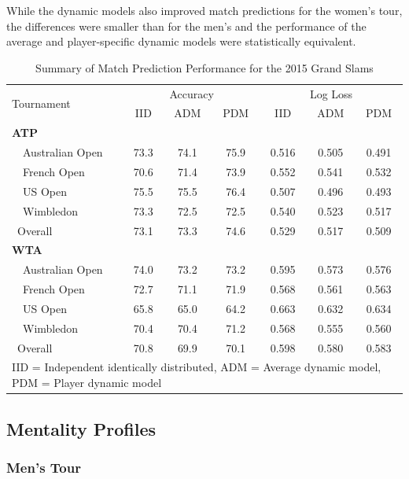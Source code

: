 \documentclass{Latex/svjour3}
\begin{document}
While the dynamic models also improved match predictions for the
women's tour, the differences were smaller than for the men's and the
performance of the average and player-specific dynamic models were
statistically equivalent. 

\begin{table} \centering
\caption{Summary of Match Prediction Performance for the 2015 Grand Slams}
\begin{tabular}{l ccc ccc} \hline
\multirow{2}{*}{Tournament} & \multicolumn{3}{c}{Accuracy} & \multicolumn{3}{c}{Log Loss} \\ 
&	IID &ADM &PDM &IID &ADM &PDM \\ \hline
\textbf{ATP} & & & & & & \\
~~Australian Open	&73.3&	74.1&	75.9&	0.516&	0.505	&0.491\\
~~French Open	&70.6&	71.4&	73.9&	0.552&	0.541	&0.532\\
~~US Open	&75.5&	75.5&	76.4&	0.507&	0.496&	0.493\\
~~Wimbledon	&73.3&	72.5&	72.5&	0.540&	0.523&	0.517\\
~Overall	&73.1&	73.3&	74.6&	0.529&	0.517&	0.509                    \\
\textbf{WTA}  & & & & & & \\
~~Australian Open	&74.0&	73.2&	73.2&	0.595&	0.573&	0.576\\
~~French Open	&72.7&	71.1&	71.9&	0.568&	0.561&	0.563\\
~~US Open	&65.8&	65.0&	64.2&	0.663&	0.632&	0.634\\
~~Wimbledon	&70.4&	70.4&	71.2&	0.568&	0.555&	0.560\\
~Overall	&70.8&	69.9&	70.1&	0.598	&0.580& 0.583\\ \hline
\multicolumn{7}{p{3.8in}}{IID = Independent identically distributed, ADM =
  Average dynamic model, PDM = Player dynamic model}
\end{tabular}
\label{tab:performance}
\end{table}

\subsection{Mentality Profiles}

\subsubsection{Men's Tour}
\end{document}
